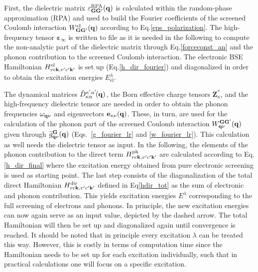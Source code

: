 %
First, the dielectric matrix $\varepsilon^\text{RPA}_{\mathbf{GG'}}(\mathbf{q})$   is calculated within the random-phase approximation (RPA) and used to build the Fourier coefficients of the screened Coulomb interaction $W^\text{el}_{\mathbf{GG'}}(\mathbf{q})$ according to Eq.\;\eqref{eps_polarization}. The high-frequency tensor $\boldsymbol{\varepsilon}_\infty$ is written to file as it is needed in the following to compute the non-analytic part of the dielectric matrix through Eq.\;\eqref{forceconst_an} and the phonon contribution to the screened Coulomb interaction. The electronic BSE Hamiltonian  $H^\text{el}_{vc\mathbf{k},v'c'\mathbf{k'}}$  is set up (Eq.\;\eqref{h_dir_fourier})  and diagonalized in order to obtain the excitation energies $E_\text{el}^\lambda$.\par
The dynamical matrices $\tilde{D}_{\kappa\alpha}^{\kappa'\alpha'\!}(\mathbf{q})$, the Born effective charge tensors $\mathbf{Z}^*_\kappa$, and the high-frequency dielectric tensor are needed in order to obtain the  phonon frequencies $\omega_{\mathbf{q}\nu}$ and eigenvectors  $\mathbf{e}_{\kappa\nu}(\mathbf{q})$. These, in turn, are used for the calculation of the phonon part of the screened Coulomb interaction $W_{\mathbf{q}\nu}^{\mathbf{GG'}}(\mathbf{q})$ given through $\widetilde{g}^{\mathbf{G}}_{\mathbf{q}\nu}(\mathbf{q})$ (Eqs.~\eqref{g_fourier_lr} and \eqref{w_fourier_lr}). This calculation as well needs the dielectric tensor as input. In the following, the elements of the phonon contribution to the direct term $H^\text{ph}_{vc\mathbf{k},v'c'\mathbf{k'}}$ are calculated according to Eq.\;\eqref{h_dir_final} where the  excitation energy obtained from pure electronic screening is used as starting point. The last step consists of the diagonalization of the total direct Hamiltonian $H^\text{dir}_{vc\mathbf{k},v'c'\mathbf{k'}}$ defined in Eq\;\eqref{hdir_tot} as the sum of electronic and phonon contribution. This  yields excitation energies $E^\lambda$  corresponding to the full screening of electrons and phonons. In principle, the new excitation energies can now again serve as an input value, depicted by the dashed arrow. The total Hamiltonian will then be set up and diagonalized again until convergence is reached. It should be noted that in principle every excitation $\lambda$ can be treated this way. However, this is costly in terms of computation time since the Hamiltonian needs to be set up for each excitation individually, such that in practical calculations one will focus on a specific excitation.
\newpage
